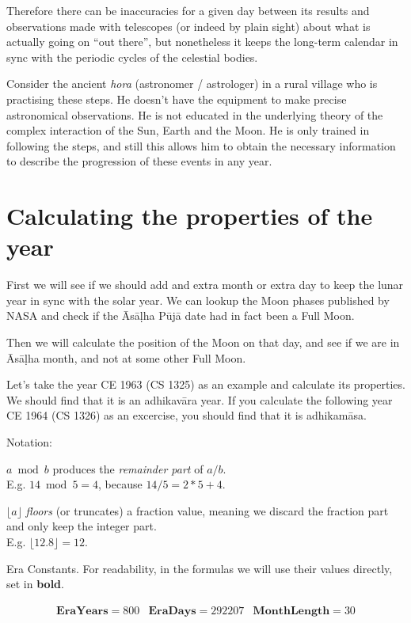 \documentclass[11pt,oneside]{memoir-article}
\begin{document}
Therefore there can be inaccuracies for a given day between its results and
observations made with telescopes (or indeed by plain sight) about what is
actually going on ``out there'', but nonetheless it keeps the long-term calendar
in sync with the periodic cycles of the celestial bodies.

Consider the ancient \emph{hora}  (astronomer / astrologer) in a rural village who is
practising these steps. He doesn't have the equipment to make precise
astronomical observations. He is not educated in the underlying theory of the
complex interaction of the Sun, Earth and the Moon. He is only trained in
following the steps, and still this allows him to obtain the necessary
information to describe the progression of these events in any year.

\section{Calculating the properties of the year}
\label{sec-5-2}

First we will see if we should add and extra month or extra day to keep the
lunar year in sync with the solar year. We can lookup the Moon phases published
by NASA and check if the Āsāḷha Pūjā date had in fact been a Full Moon.

Then we will calculate the position of the Moon on that day, and see if we are
in Āsāḷha month, and not at some other Full Moon.

Let's take the year CE 1963 (CS 1325) as an example and calculate its
properties. We should find that it is an adhikavāra year. If you calculate the
following year CE 1964 (CS 1326) as an excercise, you should find that it is
adhikamāsa.

Notation:

$a \bmod b$ produces the \emph{remainder part} of $a/b$.\\
E.g. $14 \bmod 5 = 4$, because $14/5 = 2*5 + 4$.

$\lfloor a \rfloor$ \emph{floors} (or truncates) a fraction value, meaning we discard
the fraction part and only keep the integer part.\\
E.g. $\lfloor 12.8 \rfloor = 12$.


Era Constants. For readability, in the formulas we will use their values directly, set in \textbf{bold}.

\begin{align*}
  \mathbf{EraYears} = 800 & \mathbf{EraDays} = 292207 & \mathbf{MonthLength} = 30
\end{align*}
\end{document}
